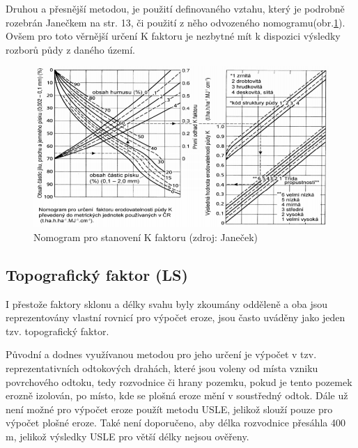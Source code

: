 \FloatBarrier Druhou a přesnější metodou, je použití definovaného
vztahu, který je podrobně rozebrán Janečkem\cite{janecek2012} na
str. 13, či použití z něho odvozeného
nomogramu(obr.\ref{fig:k_faktor}). Ovšem pro toto věrnější určení K
faktoru je nezbytné mít k dispozici výsledky rozborů půdy z daného
území.\cite{janecek2012}

\begin{figure}[H]
    \centering
    \includegraphics[scale=0.85]{./pictures/k_faktor_nomogram.png}
      \caption[Nomogram pro stanovení K faktoru]{Nomogram pro
        stanovení K faktoru (zdroj: Janeček\cite{janecek2012})}
      \label{fig:k_faktor}
\end{figure}
\subsection{Topografický faktor (LS)}
I přestože faktory sklonu a délky svahu byly zkoumány odděleně a oba
jsou reprezentovány vlastní rovnicí pro výpočet eroze, jsou často
uváděny jako jeden tzv. topografický faktor.\cite{usle1978}

Původní a dodnes využívanou metodou pro jeho určení je výpočet v
tzv. reprezentativních odtokových drahách, které jsou voleny od místa
vzniku povrchového odtoku, tedy rozvodnice či hrany pozemku, pokud je
tento pozemek erozně izolován, po místo, kde se plošná eroze mění v
soustředný odtok. Dále už není možné pro výpočet eroze použít metodu
USLE, jelikož slouží pouze pro výpočet plošné eroze. Také není
doporučeno, aby délka rozvodnice přesáhla 400 m, jelikož výsledky USLE
pro větší délky nejsou ověřeny.\cite{janecek2012}

